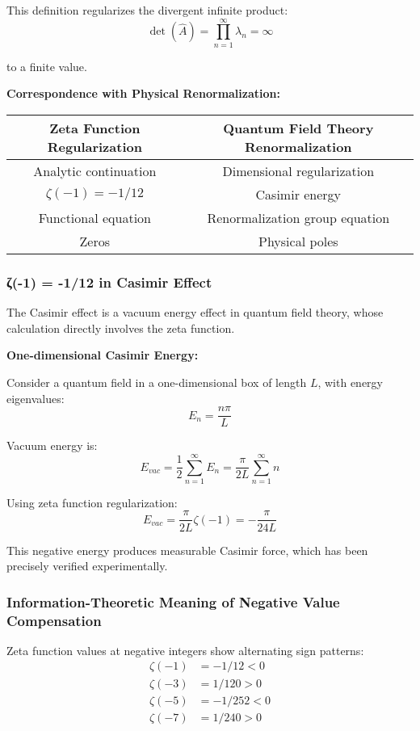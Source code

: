 \documentclass[11pt]{article}
\theoremstyle{plain}
\theoremstyle{definition}
\theoremstyle{remark}
\begin{document}
This definition regularizes the divergent infinite product:
$$\det(\hat{A}) = \prod_{n=1}^{\infty} \lambda_n = \infty$$

to a finite value.

\textbf{Correspondence with Physical Renormalization:}

\begin{center}
\begin{tabular}{|c|c|}
\hline
Zeta Function Regularization & Quantum Field Theory Renormalization \\
\hline
Analytic continuation & Dimensional regularization \\
$\zeta(-1) = -1/12$ & Casimir energy \\
Functional equation & Renormalization group equation \\
Zeros & Physical poles \\
\hline
\end{tabular}
\end{center}

\subsubsection{ζ(-1) = -1/12 in Casimir Effect}

The Casimir effect is a vacuum energy effect in quantum field theory, whose calculation directly involves the zeta function.

\textbf{One-dimensional Casimir Energy:}

Consider a quantum field in a one-dimensional box of length $L$, with energy eigenvalues:
$$E_n = \frac{n\pi}{L}$$

Vacuum energy is:
$$E_{vac} = \frac{1}{2} \sum_{n=1}^{\infty} E_n = \frac{\pi}{2L} \sum_{n=1}^{\infty} n$$

Using zeta function regularization:
$$E_{vac} = \frac{\pi}{2L} \zeta(-1) = -\frac{\pi}{24L}$$

This negative energy produces measurable Casimir force, which has been precisely verified experimentally.

\subsubsection{Information-Theoretic Meaning of Negative Value Compensation}

Zeta function values at negative integers show alternating sign patterns:
\begin{align}
\zeta(-1) &= -1/12 < 0 \\
\zeta(-3) &= 1/120 > 0 \\
\zeta(-5) &= -1/252 < 0 \\
\zeta(-7) &= 1/240 > 0
\end{align}
\end{document}
